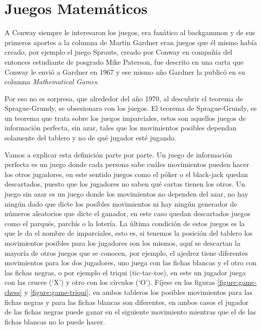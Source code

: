 \section{Juegos Matem\'aticos}

A Conway siempre le interesaron los juegos, era fan\'atico al backgammon y de sus primeros aportes a la columna de Martin Gardner eran juegos que \'el mismo hab\'ia creado, por ejemplo el juego Sprouts, creado por Conway en compa\~n\'ia del entonces estudiante de posgrado Mike Paterson, fue descrito en una carta que Conway le envi\'o a Gardner en 1967 y ese mismo a\~no Gardner la public\'o en su columna \textit{Mathematical Games}\cite{Gardner2005-vo}.

Por eso no es sorpresa, que alrededor del a\~no 1970, al descubrir el teorema de Sprague-Grundy, se obsesionara con los juegos. El teorema de Sprague-Grundy\cite{Grundy1939}, es un teorema que trata sobre los juegos imparciales, estos son aquellos juegos de informaci\'on perfecta, sin azar, tales que los movimientos posibles dependan solamente del tablero y no de qu\'e jugador est\'e jugando.

Vamos a explicar esta definici\'on parte por parte. Un juego de informaci\'on perfecta es un juego donde cada persona sabe cu\'ales movimientos pueden hacer los otros jugadores, en este sentido juegos como el p\'oker o el black-jack quedan descartados, puesto que los jugadores no saben qu\'e cartas tienen los otros. Un juego sin azar es un juego donde los movimientos no dependen del azar, no hay ning\'un dado que dicte los posibles movimientos ni hay ning\'un generador de n\'umeros aleatorios que dicte el ganador, en este caso quedan descartados juegos como el parqu\'es, parch\'is o la loter\'ia. La \'ultima condici\'on de estos juegos es la que le da el nombre de imparciales, esto es, si tenemos la posici\'on del tablero los movimientos posibles para los jugadores son los mismos, aqu\'i se descartan la mayor\'ia de otros juegos que se conocen, por ejemplo, el ajedrez tiene diferentes movimientos para los dos jugadores, uno juega con las fichas blancas y el otro con las fichas negras, o por ejemplo el triqui (tic-tac-toe), en este un jugador juega con las cruces (`X') y otro con los c\'irculos (`O'). F\'ijese en las figuras \ref{figure:game-chess} y \ref{figure:game-triqui}, en ambos tableros los posibles movimientos para las fichas negras y para las fichas blancas son diferentes, en ambos casos el jugador de las fichas negras puede ganar en el siguiente movimiento mientras que el de las fichas blancas no lo puede hacer.

